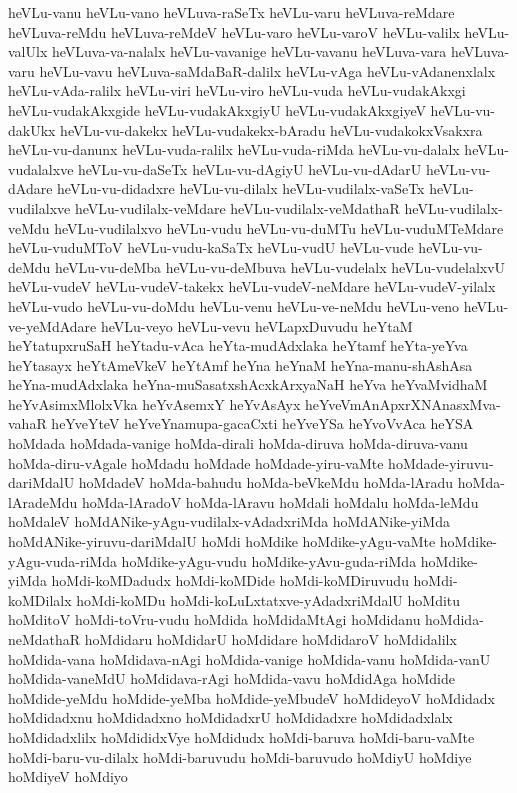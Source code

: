 {heVLu-vanu
heVLu-vano
heVLuva-raSeTx
heVLu-varu
heVLuva-reMdare
heVLuva-reMdu
heVLuva-reMdeV
heVLu-varo
heVLu-varoV
heVLu-valilx
heVLu-valUlx
heVLuva-va-nalalx
heVLu-vavanige
heVLu-vavanu
heVLuva-vara
heVLuva-varu
heVLu-vavu
heVLuva-saMdaBaR-dalilx
heVLu-vAga
heVLu-vAdanenxlalx
heVLu-vAda-ralilx
heVLu-viri
heVLu-viro
heVLu-vuda
heVLu-vudakAkxgi
heVLu-vudakAkxgide
heVLu-vudakAkxgiyU
heVLu-vudakAkxgiyeV
heVLu-vu-dakUkx
heVLu-vu-dakekx
heVLu-vudakekx-bAradu
heVLu-vudakokxVsakxra
heVLu-vu-danunx
heVLu-vuda-ralilx
heVLu-vuda-riMda
heVLu-vu-dalalx
heVLu-vudalalxve
heVLu-vu-daSeTx
heVLu-vu-dAgiyU
heVLu-vu-dAdarU
heVLu-vu-dAdare
heVLu-vu-didadxre
heVLu-vu-dilalx
heVLu-vudilalx-vaSeTx
heVLu-vudilalxve
heVLu-vudilalx-veMdare
heVLu-vudilalx-veMdathaR
heVLu-vudilalx-veMdu
heVLu-vudilalxvo
heVLu-vudu
heVLu-vu-duMTu
heVLu-vuduMTeMdare
heVLu-vuduMToV
heVLu-vudu-kaSaTx
heVLu-vudU
heVLu-vude
heVLu-vu-deMdu
heVLu-vu-deMba
heVLu-vu-deMbuva
heVLu-vudelalx
heVLu-vudelalxvU
heVLu-vudeV
heVLu-vudeV-takekx
heVLu-vudeV-neMdare
heVLu-vudeV-yilalx
heVLu-vudo
heVLu-vu-doMdu
heVLu-venu
heVLu-ve-neMdu
heVLu-veno
heVLu-ve-yeMdAdare
heVLu-veyo
heVLu-vevu
heVLapxDuvudu
heYtaM
heYtatupxruSaH
heYtadu-vAca
heYta-mudAdxlaka
heYtamf
heYta-yeYva
heYtasayx
heYtAmeVkeV
heYtAmf
heYna
heYnaM
heYna-manu-shAshAsa
heYna-mudAdxlaka
heYna-muSasatxshAcxkArxyaNaH
heYva
heYvaMvidhaM
heYvAsimxMlolxVka
heYvAsemxY
heYvAsAyx
heYveVmAnApxrXNAnasxMva-vahaR
heYveYteV
heYveYnamupa-gacaCxti
heYveYSa
heYvoVvAca
heYSA
hoMdada
hoMdada-vanige
hoMda-dirali
hoMda-diruva
hoMda-diruva-vanu
hoMda-diru-vAgale
hoMdadu
hoMdade
hoMdade-yiru-vaMte
hoMdade-yiruvu-dariMdalU
hoMdadeV
hoMda-bahudu
hoMda-beVkeMdu
hoMda-lAradu
hoMda-lAradeMdu
hoMda-lAradoV
hoMda-lAravu
hoMdali
hoMdalu
hoMda-leMdu
hoMdaleV
hoMdANike-yAgu-vudilalx-vAdadxriMda
hoMdANike-yiMda
hoMdANike-yiruvu-dariMdalU
hoMdi
hoMdike
hoMdike-yAgu-vaMte
hoMdike-yAgu-vuda-riMda
hoMdike-yAgu-vudu
hoMdike-yAvu-guda-riMda
hoMdike-yiMda
hoMdi-koMDadudx
hoMdi-koMDide
hoMdi-koMDiruvudu
hoMdi-koMDilalx
hoMdi-koMDu
hoMdi-koLuLxtatxve-yAdadxriMdalU
hoMditu
hoMditoV
hoMdi-toVru-vudu
hoMdida
hoMdidaMtAgi
hoMdidanu
hoMdida-neMdathaR
hoMdidaru
hoMdidarU
hoMdidare
hoMdidaroV
hoMdidalilx
hoMdida-vana
hoMdidava-nAgi
hoMdida-vanige
hoMdida-vanu
hoMdida-vanU
hoMdida-vaneMdU
hoMdidava-rAgi
hoMdida-vavu
hoMdidAga
hoMdide
hoMdide-yeMdu
hoMdide-yeMba
hoMdide-yeMbudeV
hoMdideyoV
hoMdidadx
hoMdidadxnu
hoMdidadxno
hoMdidadxrU
hoMdidadxre
hoMdidadxlalx
hoMdidadxlilx
hoMdididxVye
hoMdidudx
hoMdi-baruva
hoMdi-baru-vaMte
hoMdi-baru-vu-dilalx
hoMdi-baruvudu
hoMdi-baruvudo
hoMdiyU
hoMdiye
hoMdiyeV
hoMdiyo
}
